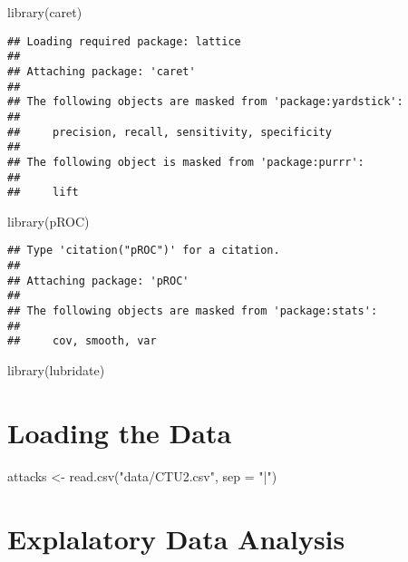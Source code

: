 \documentclass[
]{article}
\newenvironment{Shaded}{\begin{snugshade}}{\end{snugshade}}
\newcommand{\AttributeTok}[1]{\textcolor[rgb]{0.77,0.63,0.00}{#1}}
\newcommand{\FunctionTok}[1]{\textcolor[rgb]{0.00,0.00,0.00}{#1}}
\newcommand{\NormalTok}[1]{#1}
\newcommand{\OtherTok}[1]{\textcolor[rgb]{0.56,0.35,0.01}{#1}}
\newcommand{\StringTok}[1]{\textcolor[rgb]{0.31,0.60,0.02}{#1}}
\begin{document}
\begin{Shaded}
\begin{Highlighting}[]
\FunctionTok{library}\NormalTok{(}\StringTok{\textquotesingle{}caret\textquotesingle{}}\NormalTok{)}
\end{Highlighting}
\end{Shaded}

\begin{verbatim}
## Loading required package: lattice
## 
## Attaching package: 'caret'
## 
## The following objects are masked from 'package:yardstick':
## 
##     precision, recall, sensitivity, specificity
## 
## The following object is masked from 'package:purrr':
## 
##     lift
\end{verbatim}

\begin{Shaded}
\begin{Highlighting}[]
\FunctionTok{library}\NormalTok{(}\StringTok{\textquotesingle{}pROC\textquotesingle{}}\NormalTok{)}
\end{Highlighting}
\end{Shaded}

\begin{verbatim}
## Type 'citation("pROC")' for a citation.
## 
## Attaching package: 'pROC'
## 
## The following objects are masked from 'package:stats':
## 
##     cov, smooth, var
\end{verbatim}

\begin{Shaded}
\begin{Highlighting}[]
\FunctionTok{library}\NormalTok{(}\StringTok{\textquotesingle{}lubridate\textquotesingle{}}\NormalTok{)}
\end{Highlighting}
\end{Shaded}

\hypertarget{loading-the-data}{%
\section{Loading the Data}\label{loading-the-data}}

\begin{Shaded}
\begin{Highlighting}[]
\NormalTok{attacks }\OtherTok{\textless{}{-}} \FunctionTok{read.csv}\NormalTok{(}\StringTok{"data/CTU2.csv"}\NormalTok{, }\AttributeTok{sep =} \StringTok{"|"}\NormalTok{)}
\end{Highlighting}
\end{Shaded}

\hypertarget{explalatory-data-analysis}{%
\section{Explalatory Data Analysis}\label{explalatory-data-analysis}}
\end{document}
